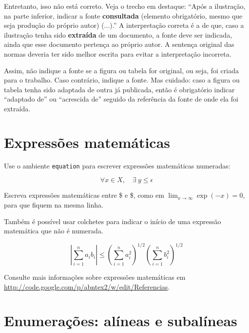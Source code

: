 Entretanto, isso não está correto.
  Veja o trecho em destaque: ``Após a ilustração, na parte inferior, indicar a fonte \textbf{consultada} (elemento obrigatório, mesmo que seja produção do próprio autor) (...).''
  A interpretação correta é a de que, caso a ilustração tenha sido \textbf{extraída} de um documento, a fonte deve ser indicada, ainda que esse documento pertença ao próprio autor.
  A sentença original das normas deveria ter sido melhor escrita para evitar a interpretação incorreta.

Assim, não indique a fonte se a figura ou tabela for original, ou seja, foi criada para o trabalho.
  Caso contrário, indique a fonte.
  Mas cuidado: caso a figura ou tabela tenha sido adaptada de outra já publicada, então é obrigatório indicar ``adaptado de'' ou ``acrescida de'' seguido da referência da fonte de onde ela foi extraída.


\section{Expressões matemáticas}

Use o ambiente \texttt{equation} para escrever expressões matemáticas numeradas:

\begin{equation}
  \forall x \in X, \quad \exists \: y \leq \epsilon
\end{equation}

Escreva expressões matemáticas entre \$ e \$, como em $\lim_{x \to \infty} \exp(-x) = 0$, para que fiquem na mesma linha.

Também é possível usar colchetes para indicar o início de uma expressão matemática que não é numerada.

\[
\left|\sum_{i=1}^n a_ib_i\right|
\le
\left(\sum_{i=1}^n a_i^2\right)^{1/2}
\left(\sum_{i=1}^n b_i^2\right)^{1/2}
\]

Consulte mais informações sobre expressões matemáticas em \url{http://code.google.com/p/abntex2/w/edit/Referencias}.


\section{Enumerações: alíneas e subalíneas}

